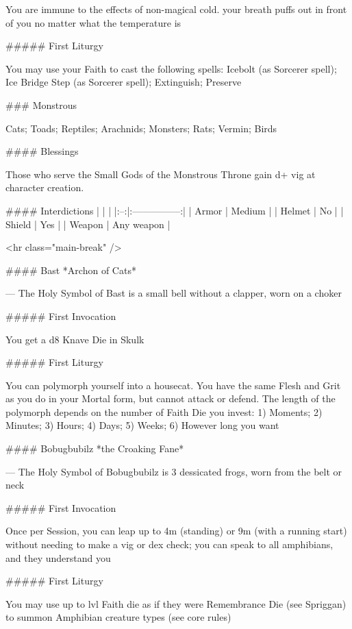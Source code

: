 You are immune to the effects of non-magical cold. your breath puffs out in front of you no matter what the temperature is

##### First Liturgy

You may use your Faith to cast the following spells: Icebolt (as Sorcerer spell); Ice Bridge Step (as Sorcerer spell); Extinguish; Preserve



### Monstrous



Cats; Toads; Reptiles; Arachnids; Monsters; Rats; Vermin; Birds



#### Blessings

Those who serve the Small Gods of the Monstrous Throne gain {d+} {vig} at character creation.

#### Interdictions
| | |
|:--:|:---------------:|
| Armor | Medium |
| Helmet | No |
| Shield | Yes |
| Weapon | Any weapon |

<hr class="main-break" />




#### Bast
*Archon of Cats*

---
The Holy Symbol of Bast is a small bell without a clapper, worn on a choker

##### First Invocation

You get a d8 Knave Die in Skulk

##### First Liturgy

You can polymorph yourself into a housecat.  You have the same Flesh and Grit as you do in your Mortal form, but cannot attack or defend.  The length of the polymorph depends on the number of Faith Die you invest:  1) Moments; 2) Minutes; 3) Hours; 4) Days; 5) Weeks; 6) However long you want




#### Bobugbubilz
*the Croaking Fane*

---
The Holy Symbol of Bobugbubilz is 3 dessicated frogs, worn from the belt or neck

##### First Invocation

Once per Session, you can leap up to 4m (standing) or 9m (with a running start) without needing to make a {vig} or {dex} check; you can speak to all amphibians, and they understand you

##### First Liturgy

You may use up to {lvl} Faith die as if they were Remembrance Die (see Spriggan) to summon Amphibian creature types (see core rules)




